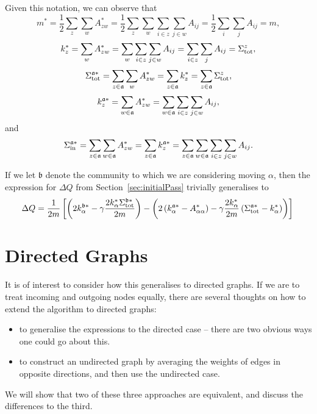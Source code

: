 \documentclass{article}
\begin{document}
Given this notation, we can observe that
\begin{equation}
m^* = \frac{1}{2}\sum_{z}\sum_{w}{A_{zw}^*} = \frac{1}{2}\sum_{z}\sum_{w}{\sum_{i \in z}\sum_{j \in w}A_{ij}} = \frac{1}{2}\sum_i\sum_jA_{ij} = m,
\end{equation}
\begin{equation}
k_{z}^* = \sum_{w}{A_{zw}^*} =  \sum_{w}{\sum_{i \in z}\sum_{j \in w}A_{ij}} = \sum_{i \in z}\sum_{j}A_{ij} = \Sigma_{\text{tot}}^{z},
\end{equation}
\begin{equation}
	\Sigma_{\text{tot}}^{\mathfrak{a} *} = \sum_{z \in \mathfrak{a}}\sum_{w}A_{zw}^* = \sum_{z \in \mathfrak{a}}k_z^* = \sum_{z \in \mathfrak{a}}\Sigma_{\text{tot}}^{z},
\end{equation}
\begin{equation}
	k_{z}^{\mathfrak{a} *} = \sum_{w \in \mathfrak{a}}{A_{zw}^*} = \sum_{w \in \mathfrak{a}}{\sum_{i \in z}\sum_{j \in w}A_{ij}},
\end{equation}
and
\begin{equation}
\Sigma_{\text{in}}^{\mathfrak{a} *} = \sum_{z \in \mathfrak{a}}\sum_{w \in \mathfrak{a}}A_{zw}^* = \sum_{z \in \mathfrak{a}}k_{z}^{\mathfrak{a} *} = \sum_{z \in \mathfrak{a}}\sum_{w \in \mathfrak{a}}{\sum_{i \in z}\sum_{j \in w}A_{ij}}.
\end{equation}

If we let $\mathfrak{b}$ denote the community to which we are considering moving $\alpha$,
then the expression for $\Delta Q$ from Section~\ref{sec:initialPass} trivially generalises to
\begin{equation}
\Delta Q = \frac{1}{2m}\left[ \left( 2 k_{\alpha}^{\mathfrak{b} *} - \gamma \frac{2k_{\alpha}^*\Sigma_{\text{tot}}^{\mathfrak{b} *}}{2m} \right) 
		- \left( 2\left( k_{\alpha}^{\mathfrak{a} *} - A_{\alpha \alpha}^* \right) - \gamma \frac{2k_{\alpha}^*}{2m} \left( \Sigma_{\text{tot}}^{\mathfrak{a} *} - k_{\alpha}^* \right ) \right) \right] \\
\end{equation}

\section{Directed Graphs}
\label{sec:directedGraphs}

It is of interest to consider how this generalises to directed graphs.
If we are to treat incoming and outgoing nodes equally, there are several
thoughts on how to extend the algorithm to directed graphs: 
\begin{itemize}
	\item to generalise the expressions to the directed case -- there are
	two obvious ways one could go about this. 
	\item to construct an undirected graph by averaging the weights of edges 
	in opposite directions, and then use the undirected case.
\end{itemize}
We will show that two of these three approaches are equivalent, and discuss
the differences to the third.
\end{document}
